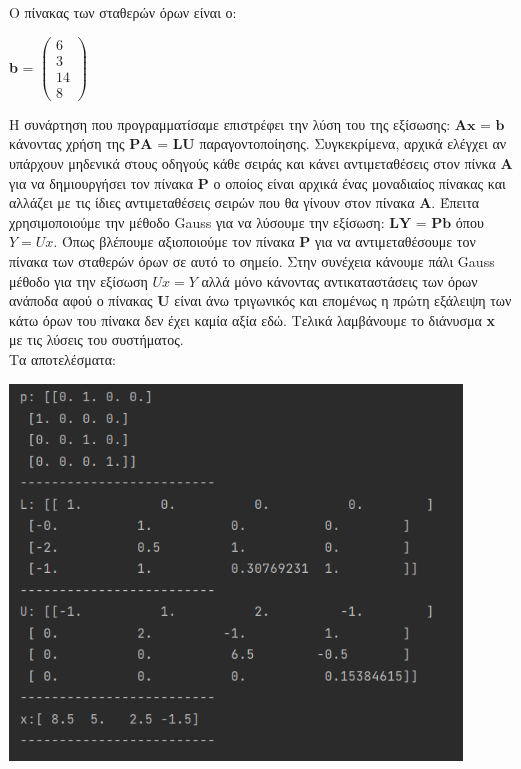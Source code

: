 \documentclass{article}
\begin{document}
Ο πίνακας των σταθερών όρων είναι ο:

\begin{center}
\textbf{b} =
$\begin{pmatrix}
6\\
3\\
14\\
8
\end{pmatrix}$
\end{center}

Η συνάρτηση που προγραμματίσαμε επιστρέφει την λύση του της εξίσωσης: \(\textbf{Ax = b}\) κάνοντας χρήση της \(\textbf{PA = LU}\) παραγοντοποίησης. Συγκεκρίμενα, αρχικά ελέγχει αν υπάρχουν μηδενικά στους οδηγούς κάθε σειράς και κάνει αντιμεταθέσεις στον πίνκα \textbf{A} για να δημιουργήσει τον πίνακα \textbf{P} ο οποίος είναι αρχικά ένας μοναδιαίος πίνακας και αλλάζει με τις ίδιες αντιμεταθέσεις σειρών που θα γίνουν στον πίνακα \textbf{A}. Έπειτα χρησιμοποιούμε την μέθοδο Gauss για να λύσουμε την εξίσωση: \(\textbf{LY = Pb}\) όπου \(Y = Ux\). Όπως βλέπουμε αξιοποιούμε τον πίνακα \textbf{P} για να αντιμεταθέσουμε τον πίνακα των σταθερών όρων σε αυτό το σημείο. Στην συνέχεια κάνουμε πάλι Gauss μέθοδο για την εξίσωση \(Ux = Y\) αλλά μόνο κάνοντας αντικαταστάσεις των όρων ανάποδα αφού ο πίνακας \textbf{U} είναι άνω τριγωνικός και επομένως η πρώτη εξάλειψη των κάτω όρων του πίνακα δεν έχει καμία αξία εδώ. Τελικά λαμβάνουμε το διάνυσμα \textbf{x} με τις λύσεις του συστήματος. \\

Τα αποτελέσματα: 
\begin{center}\includegraphics[width = 12cm, height = 10cm]{images/results_27.png}\end{center}
\end{document}
